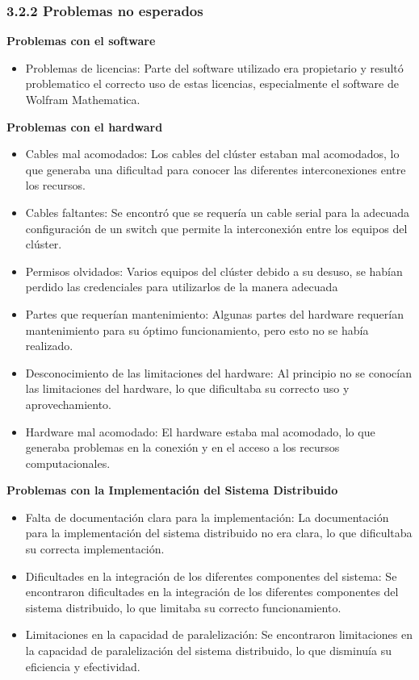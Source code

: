 \begin{doublespace}
    \subsubsection{3.2.2 Problemas no esperados}

    \textbf{Problemas con el software}

    \begin{itemize}
        \item Problemas de licencias: Parte del software utilizado era propietario y resultó problematico el correcto uso de estas licencias, especialmente el software de Wolfram Mathematica.
    \end{itemize}


    \textbf{Problemas con el hardward}

    \begin{itemize}
        \item Cables mal acomodados: Los cables del clúster estaban mal acomodados, lo que generaba una dificultad para conocer las diferentes interconexiones entre los recursos.
        \item Cables faltantes: Se encontró que se requería un cable serial para la adecuada configuración de un switch que permite la interconexión entre los equipos del clúster.
        \item Permisos olvidados: Varios equipos del clúster debido a su desuso, se habían perdido las credenciales para utilizarlos de la manera adecuada
        \item Partes que requerían mantenimiento: Algunas partes del hardware requerían mantenimiento para su óptimo funcionamiento, pero esto no se había realizado.
        \item Desconocimiento de las limitaciones del hardware: Al principio no se conocían las limitaciones del hardware, lo que dificultaba su correcto uso y aprovechamiento.
        \item Hardware mal acomodado: El hardware estaba mal acomodado, lo que generaba problemas en la conexión y en el acceso a los recursos computacionales.
    \end{itemize}

    \textbf{Problemas con la Implementación del Sistema Distribuido}

    \begin{itemize}
        \item Falta de documentación clara para la implementación: La documentación para la implementación del sistema distribuido no era clara, lo que dificultaba su correcta implementación.
        \item Dificultades en la integración de los diferentes componentes del sistema: Se encontraron dificultades en la integración de los diferentes componentes del sistema distribuido, lo que limitaba su correcto funcionamiento.
        \item Limitaciones en la capacidad de paralelización: Se encontraron limitaciones en la capacidad de paralelización del sistema distribuido, lo que disminuía su eficiencia y efectividad.
    \end{itemize}


\end{doublespace}
